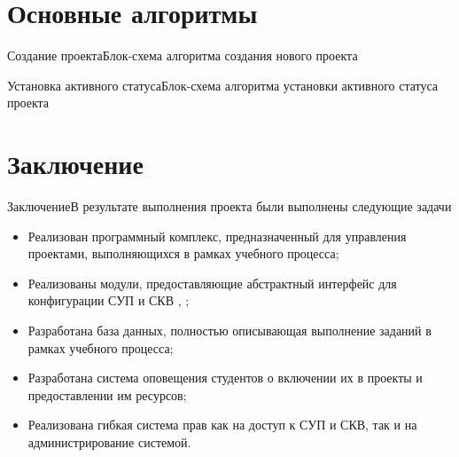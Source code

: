 \section{Основные алгоритмы}

\begin{frame}{Создание проекта}{Блок-схема алгоритма создания нового проекта}
\begin{figure}[h!]
    \label{fig:fc:project_create}
\end{figure}
\end{frame}

\begin{frame}{Установка активного статуса}{Блок-схема алгоритма установки активного статуса проекта}
\begin{figure}[h!]
    \label{fig:fc:project_set_active}
\end{figure}
\end{frame}

\section*{Заключение}

\begin{frame}{Заключение}{В результате выполнения проекта были выполнены следующие задачи}
    \begin{itemize}
    \item Реализован программный комплекс, предназначенный для управления проектами, выполняющихся в рамках учебного процесса;
    \item Реализованы модули, предоставляющие абстрактный интерфейс для конфигурации СУП  и СКВ , ;
    \item Разработана база данных, полностью описывающая выполнение заданий в рамках учебного процесса;
    \item Разработана система оповещения студентов о включении их в проекты и предоставлении им ресурсов;
    \item Реализована гибкая система прав как на доступ к СУП и СКВ, так и на администрирование системой. 
    \end{itemize}
\end{frame}



